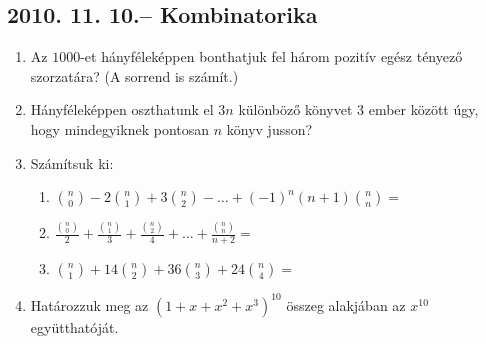 \documentclass{article}
\newenvironment{abc}{\begin{enumerate}[label=\textit{\alph*})]}{\end{enumerate}}
\begin{document}
\subsection*{2010. 11. 10.-- Kombinatorika}
\begin{enumerate}
\item Az $1000$-et hányféleképpen bonthatjuk fel három pozitív egész tényező szorzatára? (A sorrend is számít.)
\item Hányféleképpen oszthatunk el $3n$ különböző könyvet 3 ember között úgy, hogy mindegyiknek pontosan $n$ könyv jusson?
\item Számítsuk ki:
	\begin{abc}
		\item $\binom{n}{0}-2\binom{n}{1}+3\binom{n}{2}-\dots+(-1)^{n}(n+1)\binom{n}{n}=$
   		\item $\frac{\binom{n}{0}}{2}+\frac{\binom{n}{1}}{3}+\frac{\binom{n}{2}}{4}+\dots+\frac{\binom{n}{n}}{n+2}=$
    	\item $\binom{n}{1}+14\binom{n}{2}+36\binom{n}{3}+24\binom{n}{4}=$
	\end{abc}
\item Határozzuk meg az $(1+x+x^{2}+x^{3})^{10}$ összeg alakjában az $x^{10}$ együtthatóját.
\end{enumerate}
\end{document}

